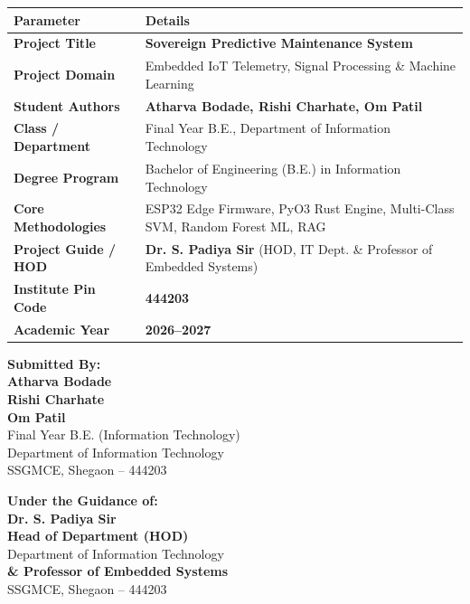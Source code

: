 \documentclass[12pt,a4paper,oneside]{report}
\begin{document}
\begin{titlepage}
\begin{center}
\begin{table}[h!]
\centering
\footnotesize
\setlength{\tabcolsep}{4.5pt}
\renewcommand{\arraystretch}{1.05}
\begin{tabularx}{\linewidth}{|l|X|}
\hline
\textbf{Parameter} & \textbf{Details} \\ \hline
\textbf{Project Title} & \textbf{Sovereign Predictive Maintenance System} \\ \hline
\textbf{Project Domain} & Embedded IoT Telemetry, Signal Processing \& Machine Learning \\ \hline
\textbf{Student Authors} & \textbf{Atharva Bodade, Rishi Charhate, Om Patil} \\ \hline
\textbf{Class / Department} & Final Year B.E., Department of Information Technology \\ \hline
\textbf{Degree Program} & Bachelor of Engineering (B.E.) in Information Technology \\ \hline
\textbf{Core Methodologies} & ESP32 Edge Firmware, PyO3 Rust Engine, Multi-Class SVM, Random Forest ML, RAG \\ \hline
\textbf{Project Guide / HOD} & \textbf{Dr. S. Padiya Sir} (HOD, IT Dept. \& Professor of Embedded Systems) \\ \hline
\textbf{Institute Pin Code} & \textbf{444203} \\ \hline
\textbf{Academic Year} & \textbf{2026--2027} \\ \hline
\end{tabularx}
\end{table}

\vspace{0.2cm}

\begin{minipage}[t]{0.48\textwidth}
\begin{flushleft}
\small
\textbf{Submitted By:}\\[0.08cm]
\textbf{Atharva Bodade}\\
\textbf{Rishi Charhate}\\
\textbf{Om Patil}\\[0.08cm]
Final Year B.E. (Information Technology)\\
Department of Information Technology\\
SSGMCE, Shegaon -- 444203
\end{flushleft}
\end{minipage}
\hfill
\begin{minipage}[t]{0.48\textwidth}
\begin{flushright}
\small
\textbf{Under the Guidance of:}\\[0.08cm]
\textbf{Dr. S. Padiya Sir}\\
\textbf{Head of Department (HOD)}\\
Department of Information Technology\\
\textbf{\& Professor of Embedded Systems}\\
SSGMCE, Shegaon -- 444203
\end{flushright}
\end{minipage}


\end{center}
\end{titlepage}
\end{document}
